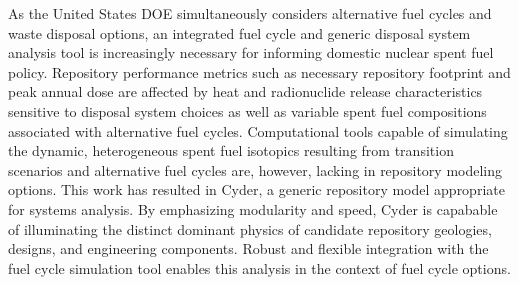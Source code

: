 As the United States \gls{DOE} simultaneously considers alternative fuel cycles 
and waste disposal options, an integrated fuel cycle and generic disposal system 
analysis tool is increasingly necessary for informing domestic nuclear spent 
fuel policy.  Repository performance metrics such as necessary repository 
footprint and peak annual dose are affected by heat and radionuclide release 
characteristics sensitive to disposal system choices as well as variable spent 
fuel compositions associated  with alternative fuel cycles.  Computational 
tools capable of simulating the dynamic, heterogeneous spent fuel isotopics 
resulting from transition scenarios and alternative fuel cycles are, however, 
lacking in repository modeling  options.  This work has resulted in Cyder, a 
generic repository model appropriate for systems analysis.  By emphasizing 
modularity and speed, Cyder is capabable of illuminating the distinct dominant 
physics of candidate repository geologies, designs, and engineering components. 
Robust and flexible integration with the \Cyclus fuel cycle simulation tool 
enables this analysis in the context of fuel cycle options.  

\glsresetall
